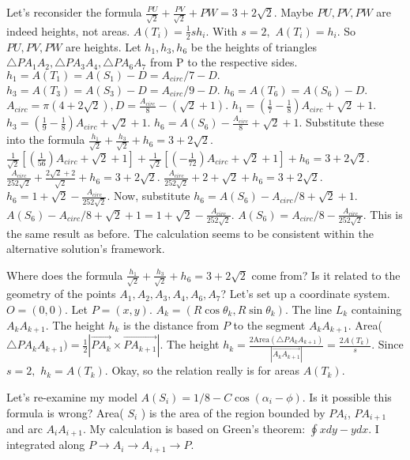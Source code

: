 Let's reconsider the formula $\frac{PU}{\sqrt{2}} + \frac{PV}{\sqrt{2}} + PW = 3+2\sqrt2.$ Maybe $PU, PV, PW$ are indeed heights, not areas. $A(T_i) = \frac{1}{2} s h_i.$ With $s=2,$ $A(T_i)=h_i.$ So $PU, PV, PW$ are heights. 
Let $h_1, h_3, h_6$ be the heights of triangles $\triangle PA_1A_2, \triangle PA_3A_4, \triangle PA_6A_7$ from P to the respective sides. 
$h_1 = A(T_1) = A(S_1) - D = A_{circ}/7 - D.$ 
$h_3 = A(T_3) = A(S_3) - D = A_{circ}/9 - D.$ 
$h_6 = A(T_6) = A(S_6) - D.$ 
$A_{circ} = \pi(4+2\sqrt{2}), D = \frac{A_{circ}}{8} - (\sqrt{2}+1).$ 
$h_1 = (\frac{1}{7}-\frac{1}{8}) A_{circ} + \sqrt{2}+1.$ 
$h_3 = (\frac{1}{9}-\frac{1}{8}) A_{circ} + \sqrt{2}+1.$ 
$h_6 = A(S_6) - \frac{A_{circ}}{8} + \sqrt{2}+1.$ 
Substitute these into the formula $\frac{h_1}{\sqrt{2}} + \frac{h_3}{\sqrt{2}} + h_6 = 3+2\sqrt{2}.$ 
$\frac{1}{\sqrt{2}} [ (\frac{1}{56}) A_{circ} + \sqrt{2}+1 ] + \frac{1}{\sqrt{2}} [ (-\frac{1}{72}) A_{circ} + \sqrt{2}+1 ] + h_6 = 3+2\sqrt{2}.$ 
$\frac{A_{circ}}{252\sqrt{2}} + \frac{2\sqrt{2}+2}{\sqrt{2}} + h_6 = 3+2\sqrt{2}.$ 
$\frac{A_{circ}}{252\sqrt{2}} + 2+\sqrt{2} + h_6 = 3+2\sqrt{2}.$ 
$h_6 = 1+\sqrt{2} - \frac{A_{circ}}{252\sqrt{2}}.$ 
Now, substitute $h_6 = A(S_6) - A_{circ}/8 + \sqrt{2}+1.$ 
$A(S_6) - A_{circ}/8 + \sqrt{2}+1 = 1+\sqrt{2} - \frac{A_{circ}}{252\sqrt{2}}.$ 
$A(S_6) = A_{circ}/8 - \frac{A_{circ}}{252\sqrt{2}}.$ 
This is the same result as before. The calculation seems to be consistent within the alternative solution's framework.

Where does the formula $\frac{h_1}{\sqrt{2}} + \frac{h_3}{\sqrt{2}} + h_6 = 3+2\sqrt{2}$ come from? 
Is it related to the geometry of the points $A_1, A_2, A_3, A_4, A_6, A_7$? 
Let's set up a coordinate system. $O=(0,0).$ Let $P=(x,y).$ 
$A_k = (R \cos \theta_k, R \sin \theta_k).$ 
The line $L_k$ containing $A_k A_{k+1}.$ The height $h_k$ is the distance from $P$ to the segment $A_k A_{k+1}.$ 
Area( $\triangle PA_kA_{k+1}) = \frac{1}{2} |\vec{PA_k} \times \vec{PA_{k+1}}|.$ 
The height $h_k = \frac{2 \text{Area}(\triangle PA_kA_{k+1})}{|\vec{A_kA_{k+1}}|} = \frac{2 A(T_k)}{s}.$ Since $s=2,$ $h_k=A(T_k).$ 
Okay, so the relation really is for areas $A(T_k).$

Let's re-examine my model $A(S_i) = 1/8 - C \cos(\alpha_i - \phi).$ Is it possible this formula is wrong? 
Area( $S_i$ ) is the area of the region bounded by $PA_i$, $PA_{i+1}$ and arc $A_i A_{i+1}$. 
My calculation is based on Green's theorem: $\oint x dy - y dx.$ I integrated along $P \to A_i \to A_{i+1} \to P.$

